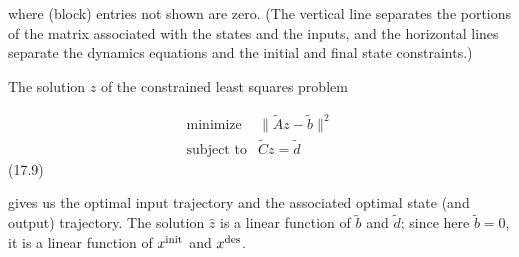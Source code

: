 where (block) entries not shown are zero. (The vertical line separates the portions of the matrix associated with the states and the inputs, and the horizontal lines separate the dynamics equations and the initial and final state constraints.)

The solution \(\hat{z}\) of the constrained least squares problem

\[\begin{array}{ll}\mbox{minimize}&\|\tilde{A}z-\tilde{b}\|^{2}\\ \mbox{subject to}&\tilde{C}z=\tilde{d}\end{array}\] (17.9)

gives us the optimal input trajectory and the associated optimal state (and output) trajectory. The solution \(\hat{z}\) is a linear function of \(\tilde{b}\) and \(\tilde{d}\); since here \(\tilde{b}=0\), it is a linear function of \(x^{\rm init}\) and \(x^{\rm des}\).

 